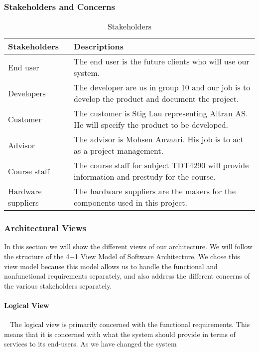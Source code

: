 \documentclass[../document]{subfiles}
\begin{document}
\subsubsection{Stakeholders and Concerns}
\begin{table}[H]
	\caption{Stakeholders}
	\begin{tabularx}{\textwidth}{|X|X|}
		\hline
		\textbf{Stakeholders}	& \textbf{Descriptions} \\ \hline
		End user				& The end user is the future clients who will use our system.  \\ \hline
		Developers				& The developer are us in group 10 and our job is to develop the product and document the project.  \\ \hline
		Customer				& The customer is Stig Lau representing Altran AS. He will specify the product to be developed.  \\ \hline
		Advisor					& The advisor is Mohsen Anvaari. His job is to act as a project management.  \\ \hline
		Course staff			& The course staff for subject TDT4290 will provide information and prestudy for the course.  \\ \hline
		Hardware suppliers		& The hardware suppliers are the makers for the components used in this project.  \\ \hline
	\end{tabularx}
\end{table}

\subsubsection{Architectural Views}
In this section we will show the different views of our architecture. We will follow the structure of the 4+1 View Model of Software Architecture. We chose this view model because this model allows us to handle the functional and nonfunctional requirements separately, and also address the different concerns of the various stakeholders separately.

\paragraph{Logical View} \ \newline				
The logical view is primarily concerned with the functional requirements. This means that it is concerned with what the system should provide in terms of services to its end-users. As we have changed the system 
\end{document}
